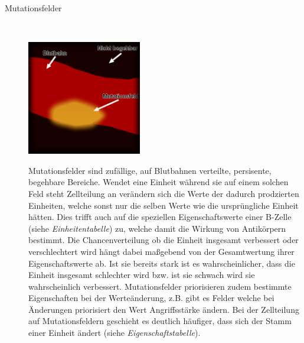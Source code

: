 \documentclass[11pt]{article}
\begin{document}
\begin{description}
\item[Mutationsfelder]\hfill \\
\begin{center}
\includegraphics[width=5cm]{mutationsfeld.png}\\
\end{center}
Mutationsfelder sind zuf\"allige, auf Blutbahnen verteilte, persisente, begehbare Bereiche. Wendet eine Einheit w\"ahrend sie auf einem solchen Feld steht Zellteilung an ver\"andern sich die Werte der dadurch prodzierten Einheiten, welche sonst nur die selben Werte wie die urspr\"ungliche Einheit h\"atten. Dies trifft auch auf die speziellen Eigenschaftswerte einer B-Zelle (siehe \textit{Einheitentabelle}) zu, welche damit die Wirkung von Antik\"orpern bestimmt. Die Chancenverteilung ob die Einheit insgesamt verbessert oder verschlechtert wird h\"angt dabei maßgebend von der Gesamtwertung ihrer Eigenschaftswerte ab. Ist sie bereits stark ist es wahrscheinlicher, dass die Einheit insgesamt schlechter wird bzw. ist sie schwach wird sie wahrscheinlich verbessert. Mutationsfelder priorisieren zudem bestimmte Eigenschaften bei der Werte\"anderung, z.B. gibt es Felder welche bei \"Anderungen priorisiert den Wert Angriffsst\"arke \"andern. Bei der Zellteilung auf Mutationsfeldern geschieht es deutlich h\"aufiger, dass sich der Stamm einer Einheit \"andert (siehe \textit{Eigenschaftstabelle}).
\end{description}
\end{document}

